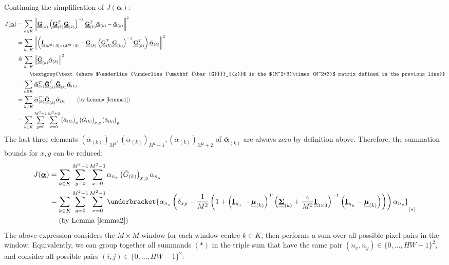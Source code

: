\documentclass{article}
\def\vt#1{\underline{\mathbf{#1}}}
\def\vts#1{\underline{\boldsymbol{#1}}}
\def\mt#1{\underline{\underline{\mathbf{#1}}}}
\def\mts#1{\underline{\underline{\boldsymbol{#1}}}}
\begin{document}
Continuing the simplification of $J(\vts\alpha)$:
\begin{align*}
    J(\vts\alpha) &=  \sum_{k\in K} \left\| \mt G_{(k)}\left(\mt G_{(k)}^T \mt G_{(k)} \right)^{-1} \mt G_{(k)}^T \vts{\bar{\alpha}}_{(k)}  - \vts{\bar{\alpha}}_{(k)} \right\|^2\\
    &=  \sum_{k\in K} \left\| \left(\mt I_{(M^2+3)\times(M^2+3)} -  \mt G_{(k)}\left(\mt G_{(k)}^T \mt G_{(k)} \right)^{-1} \mt G_{(k)}^T \right) \vts{\bar{\alpha}}_{(k)}   \right\|^2\\
    &\triangleq  \sum_{k\in K} \left\| \mt{\bar{G}}_{(k)} \vts{\bar{\alpha}}_{(k)}   \right\|^2\\
    &\quad\quad\ \textgrey{\text{where $\mt{\bar{G}}_{(k)}$ is the $(M^2+3)\times(M^2+3)$ matrix defined in the previous line}}\\
    &= \sum_{k\in K} \vts{\bar{\alpha}}_{(k)}^T \mt{\bar{G}}_{(k)}^T \mt{\bar{G}}_{(k)} \vts{\bar{\alpha}}_{(k)}\\
    &= \sum_{k\in K} \vts{\bar{\alpha}}_{(k)}^T  \mt{\bar{G}}_{(k)} \vts{\bar{\alpha}}_{(k)} \qquad\text{(by Lemma \ref{lemma1})}\\
    &= \sum_{k\in K} \sum_{y=0}^{M^2+2} \sum_{x=0}^{M^2+2} \left({\bar{\alpha}}_{(k)}\right)_x  \left({\bar{G}}_{(k)}\right)_{x,y} \left({\bar{\alpha}}_{(k)}\right)_y
\end{align*}
The last three elements $\left({\bar{\alpha}}_{(k)}\right)_{M^2}, \left({\bar{\alpha}}_{(k)}\right)_{M^2+1}, \left({\bar{\alpha}}_{(k)}\right)_{M^2+2}$ of $\vts{\bar{\alpha}}_{(k)}$ are always zero by definition above. Therefore, the summation bounds for $x,y$ can be reduced: %
\begin{align*}
    J(\vts\alpha) &= \sum_{k\in K} \sum_{y=0}^{M^2-1} \sum_{x=0}^{M^2-1} \alpha_{n_x}  \left({\bar{G}}_{(k)}\right)_{x,y} \alpha_{n_y}\\
    &= \sum_{k\in K} \sum_{y=0}^{M^2-1} \sum_{x=0}^{M^2-1} \underbracket{\alpha_{n_x}  \left( \delta_{xy} - \frac1{M^2}\left(1 + \left(\vt{I}_{n_x} - \vts \mu_{(k)}\right)^T \left(\mts \Sigma_{(k)} + \frac\epsilon{M^2} \mt{I}_{3\times 3}\right)^{-1} \left(\vt{I}_{n_y} - \vts \mu_{(k)}\right) \right) \right) \alpha_{n_y}}_{(*)}\\
    &\quad\ \text{(by Lemma \ref{lemma2})}
\end{align*}
The above expression considers the $M\times M$ window for each window centre $k\in K$, then performs a sum over all possible pixel pairs in the window. Equivalently, we can group together all summands $(*)$ in the triple sum that have the same pair $(n_x,n_y)\in\{0,\dots,HW-1\}^2$, and consider all possible pairs $(i,j)\in\{0,\dots,HW-1\}^2$: \label{appendix:theorem-1-project}
\end{document}
